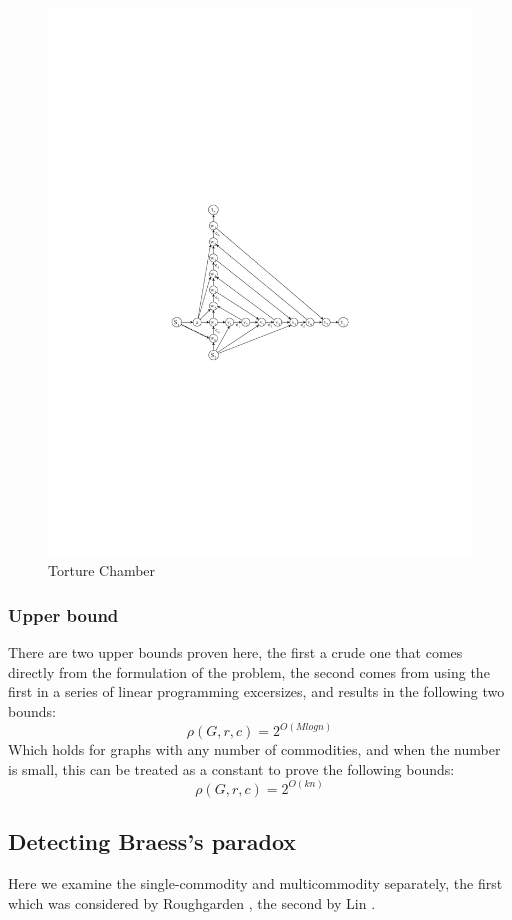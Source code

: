 \documentclass[a4paper,12pt]{article}
\begin{document}
\begin{figure}
  \includegraphics[width=\linewidth]{figures/cropped_mcbp.pdf}
  \caption{Torture Chamber}
  \label{fig:torture}
\end{figure}



\subsubsection*{Upper bound}

There are two upper bounds proven here, the first a crude one that comes directly from the formulation of the problem, the second comes from using the first in a series of linear programming excersizes, and results in the following two bounds: 
%
$$
\rho (G, r, c) = 2^{O(M log n)}
$$
%
Which holds for graphs with any number of commodities, and when the number is small, this can be treated as a constant to prove the following bounds: 
%
$$
\rho (G, r, c) = 2^{O(kn)}
$$
%
\subsection*{Detecting Braess's paradox}
Here we examine the single-commodity and multicommodity separately, the first which was considered by Roughgarden \cite{designing}, the second by Lin \cite{fibonacci}. 
\end{document}
